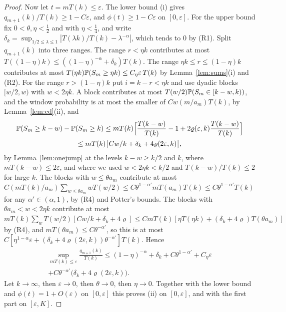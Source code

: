 \begin{proof}
Now let $t=mT(k)\le\varepsilon$. The lower bound (i) gives $q_{m+1}(k)/T(k)\ge1-C\varepsilon$, and
$\phi(t)\ge1-C\varepsilon$ on $[0,\varepsilon]$. For the upper bound fix $0<\theta,\eta<\frac12$ and
with $\eta<\frac14$, and write $\delta_k=\sup_{1/2\le\lambda\le1}|T(\lambda k)/T(k)-\lambda^{-\alpha}|$,
which tends to $0$ by (R1).
Split $q_{m+1}(k)$ into three ranges. The range $r<\eta k$ contributes at most
$T((1-\eta)k)\le((1-\eta)^{-\alpha}+\delta_k)T(k)$. The range $\eta k\le r\le(1-\eta)k$ contributes
at most $T(\eta k)\mathbb{P}(S_m\ge\eta k)\le C_\eta\varepsilon\,T(k)$ by Lemma~\ref{lem:sums}(i) and (R2).
For the range $r>(1-\eta)k$ put $i=k-r<\eta k$ and use dyadic blocks $[w/2,w)$ with $w<2\eta k$. A block
contributes at most $T(w/2)\mathbb{P}(S_m\in[k-w,k))$, and the window probability is at most
the smaller of $Cw(m/a_m)T(k)$, by Lemma~\ref{lem:cd}(ii), and
\begin{multline*}
 \mathbb{P}(S_m\ge k-w)-\mathbb{P}(S_m\ge k)
 \le mT(k)\Bigl[\frac{T(k-w)}{T(k)}-1+2\varrho(\varepsilon,k)\frac{T(k-w)}{T(k)}\Bigr]\\
 \le mT(k)\bigl[Cw/k+\delta_k+4\varrho(2\varepsilon,k)\bigr],
\end{multline*}
by Lemma~\ref{lem:onejump} at the levels $k-w\ge k/2$ and $k$, where $mT(k-w)\le2\varepsilon$, and
where we used $w<2\eta k<k/2$ and $T(k-w)/T(k)\le2$ for large $k$. The
blocks with $w\le\theta a_m$ contribute at most $C(mT(k)/a_m)\sum_{w\le\theta a_m}wT(w/2)\le C\theta^{1-\alpha'}mT(a_m)T(k)\le C\theta^{1-\alpha'}T(k)$
for any $\alpha'\in(\alpha,1)$, by (R4) and Potter's bounds. The blocks with
$\theta a_m<w<2\eta k$ contribute at most
$mT(k)\sum_{w}T(w/2)[Cw/k+\delta_k+4\varrho]\le CmT(k)[\eta T(\eta k)+(\delta_k+4\varrho)T(\theta a_m)]$ by (R4),
and $mT(\theta a_m)\le C\theta^{-\alpha'}$, so this is at most
$C[\eta^{1-\alpha}\varepsilon+(\delta_k+4\varrho(2\varepsilon,k))\theta^{-\alpha'}]T(k)$. Hence
\begin{multline*}
 \sup_{mT(k)\le\varepsilon}\frac{q_{m+1}(k)}{T(k)}
 \le(1-\eta)^{-\alpha}+\delta_k+C\theta^{1-\alpha'}+C_\eta\varepsilon\\
 +C\theta^{-\alpha'}\bigl(\delta_k+4\varrho(2\varepsilon,k)\bigr).
\end{multline*}
Let $k\to\infty$, then $\varepsilon\to0$, then $\theta\to0$, then $\eta\to0$. Together with the lower
bound and $\phi(t)=1+O(\varepsilon)$ on $[0,\varepsilon]$ this proves (ii) on $[0,\varepsilon]$, and with the
first part on $[\varepsilon,K]$.
\end{proof}
